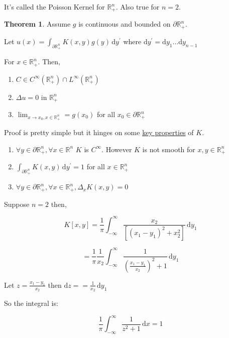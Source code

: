 \documentclass{article}
\theoremstyle{definition}
\newtheorem{theorem}{Theorem}
\begin{document}
It's called the Poisson Kernel for \(\mathbb{R}^n_+\). Also true for \(n=2\).

\begin{theorem}
    Assume \(g\) is continuous and bounded on \(\partial \mathbb{R} ^n _+\).
    
    Let \(u(x)=\int_{\partial \mathbb{R} ^n_+}^{} K(x,y)g(y) \,\mathrm{d}y^{\prime}  \) where \(\mathrm{d} y^{\prime} =\mathrm{d} y_1 \dots \mathrm{d} y_{n-1} \) 

    For \(x\in\mathbb{R} ^n_+\). Then,

    \begin{enumerate}
        \item \(C \in C^{\infty} (\mathbb{R} ^n_+)\cap L^{\infty} (\mathbb{R} ^n_+)\) 
        \item \(\Delta u = 0\) in \(\mathbb{R} ^n_+\)
        \item \(\lim_{x \to x_0, x\in \mathbb{R} ^n_+} = g(x_0) \) for all \(x_0\in \partial \mathbb{R} ^n_+\)   
    \end{enumerate}

\end{theorem}

Proof is pretty simple but it hinges on some \underline{key properties} of \(K\).

\begin{enumerate}
    \item \(\forall y\in \partial \mathbb{R} _+^n, \forall x\in \mathbb{R} ^n\) \(K\) is \(C^{\infty}\). However \(K\) is not smooth for \(x,y\in\mathbb{R} ^n_+\) 
    \item \(\int_{\partial \mathbb{R} ^n_+}^{} K(x,y) \,\mathrm{d}y^{\prime} = 1\) for all \(x\in\mathbb{R} ^n_+\)
    \item\(\forall y\in \partial \mathbb{R} ^n_+,\forall x\in\mathbb{R} ^n_+, \Delta_x K(x,y)=0\) 

\end{enumerate}

Suppose \(n=2\) then,

\[
    K[x,y]=\frac{1}{\pi }\int_{-\infty}^{\infty} \frac{x_2}{[(x_1 - y_1)^2 + x_2^2]} \,\mathrm{d}y_1 
\]

\[
    =\frac{1}{\pi }\frac{1}{x_2}\int_{-\infty}^{\infty} \frac{1}{(\frac{x_1 - y_1}{x_2})^2 + 1} \,\mathrm{d}y_1 
\]

Let \(z = \frac{x_1 - y_1}{x_2} \) then \(\mathrm{d} z = =\frac{1}{x_2}\,\mathrm{d}y_1 \)

So the integral is:

\[
    \frac{1}{\pi} \int_{-\infty}^{\infty} \frac{1}{z^2 + 1 } \,\mathrm{d}x = 1
\]
\end{document}
